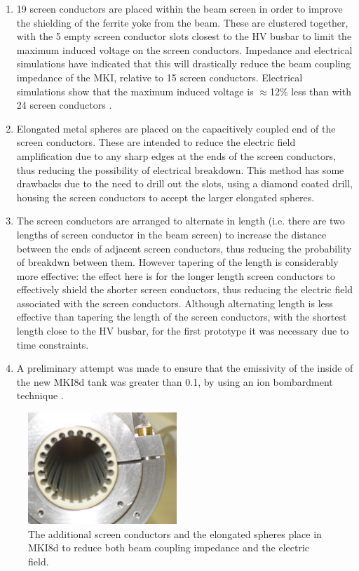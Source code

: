 \begin{enumerate}
\item{19 screen conductors are placed within the beam screen in order to improve the shielding of the ferrite yoke from the beam. These are clustered together, with the 5 empty screen conductor slots closest to the HV busbar to limit the maximum induced voltage on the screen conductors. Impedance and electrical simulations have indicated that this will drastically reduce the beam coupling impedance of the MKI, relative to 15 screen conductors. Electrical simulations show that the maximum induced voltage is $\approx$12\% less than with 24 screen conductors \cite{Barnes:mkiElec}.}
\item{Elongated metal spheres are placed on the capacitively coupled end of the screen conductors. These are intended to reduce the electric field amplification due to any sharp edges at the ends of the screen conductors, thus reducing the possibility of electrical breakdown. This method has some drawbacks due to the need to drill out the slots, using a diamond coated drill, housing the screen conductors to accept the larger elongated spheres.}
\item{The screen conductors are arranged to alternate in length (i.e. there are two lengths of screen conductor in the beam screen) to increase the distance between the ends of adjacent screen conductors, thus reducing the probability of breakdwn between them. However tapering of the length is considerably more effective: the effect here is for the longer length screen conductors to effectively shield the shorter screen conductors, thus reducing the electric field associated with the screen conductors. Although alternating length is less effective than tapering the length of the screen conductors, with the shortest length close to the HV busbar, for the first prototype it was necessary due to time constraints.}
\item{A preliminary attempt was made to ensure that the emissivity of the inside of the new MKI8d tank was greater than 0.1, by using an ion bombardment technique \cite{Barnes:mkiElec}.}
\end{enumerate}

\begin{figure}
\begin{center}
\includegraphics[width=0.5\textwidth]{LHC_MKI/figures/mki8d-balls.jpg}
\end{center}
\caption{The additional screen conductors and the elongated spheres place in MKI8d to reduce both beam coupling impedance and the electric field.}
\label{fig:mki8d-points}
\end{figure}

